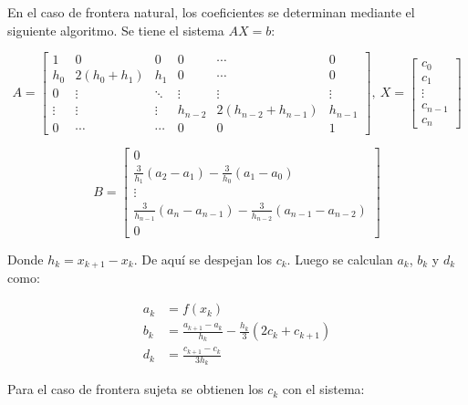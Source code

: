 \documentclass{article}
\begin{document}
En el caso de frontera natural, los coeficientes se determinan mediante el
siguiente algoritmo. Se tiene el sistema $AX=b$:

\begin{equation*}
    A = \begin{bmatrix}
        1 & 0 & 0 & 0 & \cdots & 0 \\
        h_0 & 2(h_0 + h_1) & h_1 & 0 & \cdots & 0 \\
        0 & \vdots & \ddots & \vdots & \vdots & \vdots \\
        \vdots & \vdots & \vdots & h_{n-2} & 2(h_{n-2} + h_{n-1}) & h_{n-1} \\
        0 & \cdots & \cdots & 0 & 0 & 1
    \end{bmatrix},\ 
    X = \begin{bmatrix}
        c_0 \\
        c_1 \\
        \vdots \\
        c_{n-1} \\
        c_n
    \end{bmatrix}
\end{equation*}

\begin{equation*}
    B = \begin{bmatrix}
        0 \\
        \frac{3}{h_1}(a_2 - a_1) - \frac{3}{h_0} (a_1 - a_0) \\
        \vdots \\
        \frac{3}{h_{n-1}} (a_n - a_{n-1}) - \frac{3}{h_{n-2}}(a_{n-1} - a_{n-2}) \\
        0
    \end{bmatrix}
\end{equation*}

Donde $h_k = x_{k+1} - x_k$. De aquí se despejan los $c_k$. Luego se calculan 
$a_k$, $b_k$ y $d_k$ como:

\begin{align*}
    a_k &= f(x_k) \\
    b_k &= \frac{a_{k+1} - a_k}{h_k} - \frac{h_k}{3}(2c_k + c_{k+1}) \\
    d_k &= \frac{c_{k+1} - c_k}{3h_k}
\end{align*}

Para el caso de frontera sujeta se obtienen los $c_k$ con el sistema:
\end{document}
